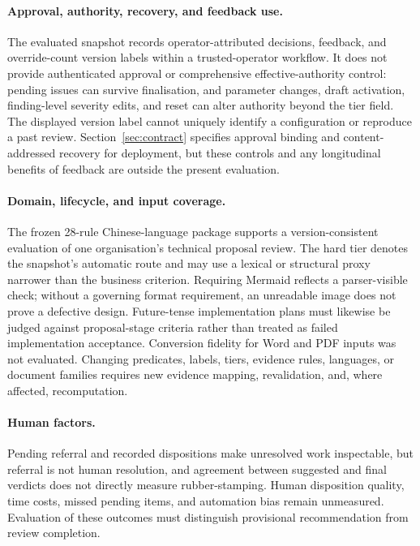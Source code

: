 \documentclass[computers,article,submit,moreauthors]{Definitions/mdpi}
\begin{document}
\paragraph{Approval, authority, recovery, and feedback use.}
The evaluated snapshot records operator-attributed decisions, feedback, and override-count version labels within a trusted-operator workflow. It does not provide authenticated approval or comprehensive effective-authority control: pending issues can survive finalisation, and parameter changes, draft activation, finding-level severity edits, and reset can alter authority beyond the tier field. The displayed version label cannot uniquely identify a configuration or reproduce a past review. Section~\ref{sec:contract} specifies approval binding and content-addressed recovery for deployment, but these controls and any longitudinal benefits of feedback are outside the present evaluation.

\paragraph{Domain, lifecycle, and input coverage.}
The frozen 28-rule Chinese-language package supports a version-consistent evaluation of one organisation's technical proposal review. The hard tier denotes the snapshot's automatic route and may use a lexical or structural proxy narrower than the business criterion. Requiring Mermaid reflects a parser-visible check; without a governing format requirement, an unreadable image does not prove a defective design. Future-tense implementation plans must likewise be judged against proposal-stage criteria rather than treated as failed implementation acceptance. Conversion fidelity for Word and PDF inputs was not evaluated. Changing predicates, labels, tiers, evidence rules, languages, or document families requires new evidence mapping, revalidation, and, where affected, recomputation.

\paragraph{Human factors.}
Pending referral and recorded dispositions make unresolved work inspectable, but referral is not human resolution, and agreement between suggested and final verdicts does not directly measure rubber-stamping. Human disposition quality, time costs, missed pending items, and automation bias remain unmeasured. Evaluation of these outcomes must distinguish provisional recommendation from review completion.
\end{document}
